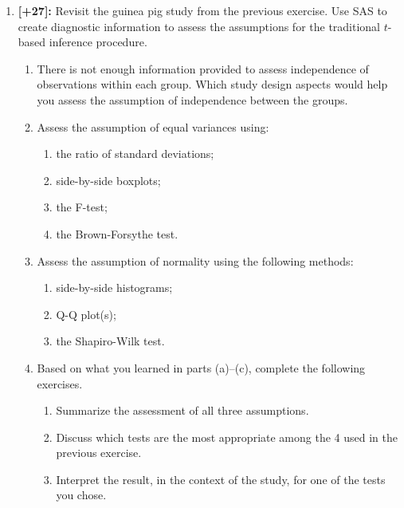 \documentclass[11pt]{article}
\begin{document}
\begin{enumerate}
\item \textbf{[+27]:} Revisit the guinea pig study from the previous exercise. Use SAS to create diagnostic information to assess the assumptions for the traditional $t$-based inference procedure.
	\begin{enumerate}
	\item There is not enough information provided to assess independence of observations within each group. Which study design aspects would help you assess the assumption of independence between the groups.
	\vspace{2in}
	\item Assess the assumption of equal variances using:
		\begin{enumerate}
		\item the ratio of standard deviations;
		\vspace{2in}
		\item side-by-side boxplots;
		\vspace{2in}
		\item the F-test;
		\vspace{2in}
		\item the Brown-Forsythe test.
		\vspace{2in}
		\end{enumerate}
	\item Assess the assumption of normality using the following methods:
		\begin{enumerate}
		\item side-by-side histograms;
		\vspace{2.25in}
		\item Q-Q plot(s);
		\vspace{2.25in}
		\item the Shapiro-Wilk test.
		\vspace{2in}
		\end{enumerate}
	\item Based on what you learned in parts (a)--(c), complete the following exercises. 
		\begin{enumerate}
		\item Summarize the assessment of all three assumptions.
		\vspace{3in}
		\item Discuss which tests are the most appropriate among the 4 used in the previous exercise.
		\vspace{3in}
		\item Interpret the result, in the context of the study, for one of the tests you chose.
		\end{enumerate}
	\end{enumerate}


\end{enumerate}
\end{document}
